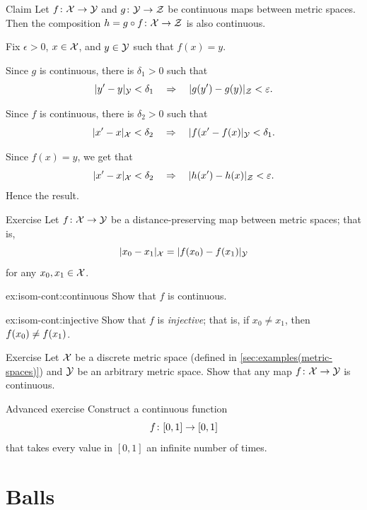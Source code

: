 \begin{thm}{Claim}\label{ex:comp+cont}
Let $f\colon\mathcal{X}\to\mathcal{Y}$
and $g\colon\mathcal{Y}\to\mathcal{Z}$ be continuous maps between  metric spaces.
Then the composition $h=g\circ f\colon\mathcal{X}\to \mathcal{Z}$ is also continuous.
\end{thm}

Fix $\epsilon>0$, $x\in \mathcal{X}$, and $y\in\mathcal{Y}$
such that $f(x)=y$.

Since $g$ is continuous, there is $\delta_1>0$ such that
$$
|y'-y|_{\mathcal{Y}}<\delta_1
\quad
\Rightarrow
\quad
|g(y')-g(y)|_{\mathcal{Z}}<\varepsilon.$$

Since $f$ is continuous, there is $\delta_2>0$ such that
$$|x'-x|_{\mathcal{X}}<\delta_2
\quad
\Rightarrow
\quad
|f(x'-f(x)|_{\mathcal{Y}}<\delta_1.$$

Since $f(x)=y$, we get that
$$
|x'-x|_{\mathcal{X}}<\delta_2
\quad
\Rightarrow
\quad
|h(x')-h(x)|_{\mathcal{Z}}<\varepsilon.$$
Hence the result.
\qeds

\begin{thm}{Exercise}\label{ex:isom-cont}
Let $f\colon\mathcal{X}\to\mathcal{Y}$ be a distance-preserving map between metric spaces;
that is,
\[|x_0-x_1|_{\mathcal{X}}=
|f(x_0)-f(x_1)|_{\mathcal Y}\]
for any $x_0,x_1\in \mathcal{X}$.

\begin{subthm}{ex:isom-cont:continuous}
Show that $f$ is continuous.
\end{subthm}

\begin{subthm}{ex:isom-cont:injective}
Show that $f$ is \emph{injective}; that is, if $x_0\ne x_1$, then $f(x_0)\z\ne f(x_1)$.
\end{subthm}

\end{thm}

\begin{thm}{Exercise}\label{ex:to-descrete}
Let $\mathcal{X}$ be a discrete metric space (defined in \ref{sec:examples(metric-spaces)})
and $\mathcal{Y}$ be an arbitrary metric space.
Show that any map $f\colon\mathcal{X}\to\mathcal{Y}$ is continuous.
\end{thm}



\begin{thm}{Advanced exercise}\label{ex:infinite-inverse-image}
Construct a continuous function 
\[f\:[0,1]\z\to [0,1]\] that takes every value in $[0,1]$ 
an infinite number of times.
\end{thm}


\section{Balls}

